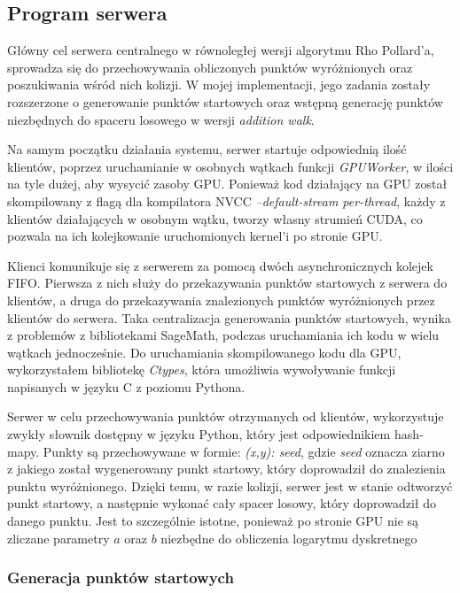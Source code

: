 \subsection{Program serwera}
Główny cel serwera centralnego w równoległej wersji algorytmu Rho Pollard'a, sprowadza się do
przechowywania obliczonych punktów wyróżnionych oraz poszukiwania wśród nich kolizji.
W mojej implementacji, jego zadania zostały rozszerzone o generowanie punktów startowych
oraz wstępną generację punktów niezbędnych do spaceru losowego w wersji \textit{addition walk}.
\par
Na samym początku działania systemu, serwer startuje odpowiednią ilość
klientów, poprzez uruchamianie w osobnych wątkach funkcji \textit{GPUWorker},
w ilości na tyle dużej, aby wysycić zasoby GPU.
Ponieważ kod działający na GPU został skompilowany z flagą dla kompilatora NVCC \textit{--default-stream per-thread},
każdy z klientów działających w osobnym wątku, tworzy własny strumień CUDA, co pozwala na ich kolejkowanie uruchomionych kernel'i po stronie GPU.
\par
Klienci komunikuje się z serwerem za pomocą dwóch asynchronicznych kolejek FIFO.
Pierwsza z nich służy do przekazywania punktów startowych z serwera do klientów, a druga do przekazywania
znalezionych punktów wyróżnionych przez klientów do serwera. Taka centralizacja
generowania punktów startowych, wynika z problemów z bibliotekami SageMath,
podczas uruchamiania ich kodu w wielu wątkach jednocześnie.
Do uruchamiania skompilowanego kodu dla GPU, wykorzystałem
bibliotekę \textit{Ctypes}, która umożliwia wywoływanie funkcji napisanych w języku C z poziomu Pythona.
\par
Serwer w celu przechowywania punktów otrzymanych od klientów, wykorzystuje
zwykły słownik dostępny w języku Python, który jest odpowiednikiem hash-mapy.
Punkty są przechowywane w formie: \textit{(x,y): seed}, gdzie \textit{seed} oznacza
ziarno z jakiego został wygenerowany punkt startowy, który doprowadził do znalezienia punktu wyróżnionego.
Dzięki temu, w razie kolizji, serwer jest w stanie odtworzyć punkt startowy, a następnie wykonać cały spacer losowy, który doprowadził do danego punktu.
Jest to szczególnie istotne, ponieważ po stronie GPU nie są zliczane parametry $a$ oraz $b$ niezbędne do obliczenia
logarytmu dyskretnego

\subsubsection{Generacja punktów startowych}

